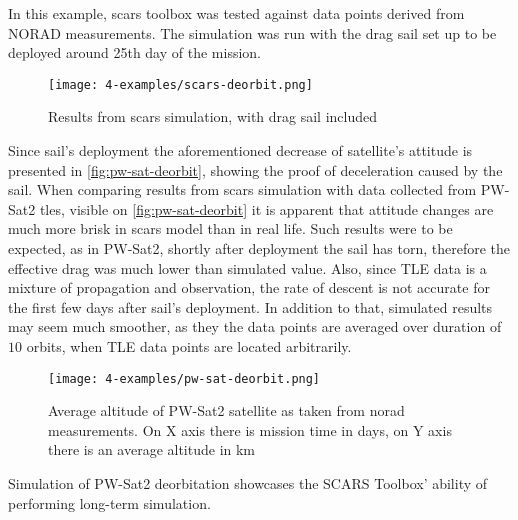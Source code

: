             In this example, \ac{scars} toolbox was tested against data points derived from NORAD measurements. The simulation was run with the drag sail set up to be deployed around 25th day of the mission.
                         
            \begin{figure}[H]
                \centering
                \texttt{[image: 4-examples/scars-deorbit.png]}
                \caption{Results from \ac{scars} simulation, with drag sail included}
                \label{fig:scars-deorbit}
            \end{figure}

            Since sail's deployment the aforementioned decrease of satellite's attitude is presented in \autoref{fig:pw-sat-deorbit}, showing the proof of deceleration caused by the sail. When comparing results from \ac{scars} simulation with data collected from PW-Sat2 \ac{tle}s, visible on \autoref{fig:pw-sat-deorbit} it is apparent that attitude changes are much more brisk in \ac{scars} model than in real life. Such results were to be expected, as in PW-Sat2, shortly after deployment the sail has torn, therefore the effective drag was much lower than simulated value\cite{space24_pwsat}. Also, since TLE data is a mixture of propagation and observation, the rate of descent is not accurate for the first few days after sail's deployment. In addition to that, simulated results may seem much smoother, as they the data points are averaged over duration of $10$ orbits, when TLE data points are located arbitrarily.
            
            \begin{figure}[H]
                \centering
                \texttt{[image: 4-examples/pw-sat-deorbit.png]}
                \caption{Average altitude of PW-Sat2 satellite as taken from \ac{norad} measurements. On X axis there is mission time in days, on Y axis there is an average altitude in km\cite{pw_sat2_deorbit}}
                \label{fig:pw-sat-deorbit}
            \end{figure}

            Simulation of PW-Sat2 deorbitation showcases the SCARS Toolbox' ability of performing long-term simulation.
            


